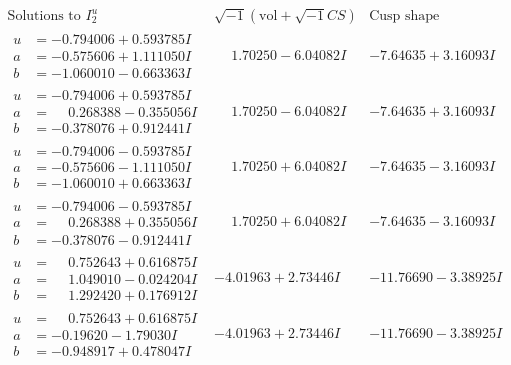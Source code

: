 \documentclass[1p]{elsarticle_modified}
\theoremstyle{definition}
\newcommand{\I}{\sqrt{-1}}
\begin{document}
$$\begin{array}{c|c|c}  
\text{Solutions to }I^u_{2}& \I (\text{vol} + \sqrt{-1}CS) & \text{Cusp shape}\\
 \hline 
\begin{aligned}
u &= -0.794006 + 0.593785 I \\
a &= -0.575606 + 1.111050 I \\
b &= -1.060010 - 0.663363 I\end{aligned}
 & \phantom{-}1.70250 - 6.04082 I & -7.64635 + 3.16093 I \\ \hline\begin{aligned}
u &= -0.794006 + 0.593785 I \\
a &= \phantom{-}0.268388 - 0.355056 I \\
b &= -0.378076 + 0.912441 I\end{aligned}
 & \phantom{-}1.70250 - 6.04082 I & -7.64635 + 3.16093 I \\ \hline\begin{aligned}
u &= -0.794006 - 0.593785 I \\
a &= -0.575606 - 1.111050 I \\
b &= -1.060010 + 0.663363 I\end{aligned}
 & \phantom{-}1.70250 + 6.04082 I & -7.64635 - 3.16093 I \\ \hline\begin{aligned}
u &= -0.794006 - 0.593785 I \\
a &= \phantom{-}0.268388 + 0.355056 I \\
b &= -0.378076 - 0.912441 I\end{aligned}
 & \phantom{-}1.70250 + 6.04082 I & -7.64635 - 3.16093 I \\ \hline\begin{aligned}
u &= \phantom{-}0.752643 + 0.616875 I \\
a &= \phantom{-}1.049010 - 0.024204 I \\
b &= \phantom{-}1.292420 + 0.176912 I\end{aligned}
 & -4.01963 + 2.73446 I & -11.76690 - 3.38925 I \\ \hline\begin{aligned}
u &= \phantom{-}0.752643 + 0.616875 I \\
a &= -0.19620 - 1.79030 I \\
b &= -0.948917 + 0.478047 I\end{aligned}
 & -4.01963 + 2.73446 I & -11.76690 - 3.38925 I \\ \hline\begin{aligned}

\end{aligned}
\end{array}$$
\end{document}
